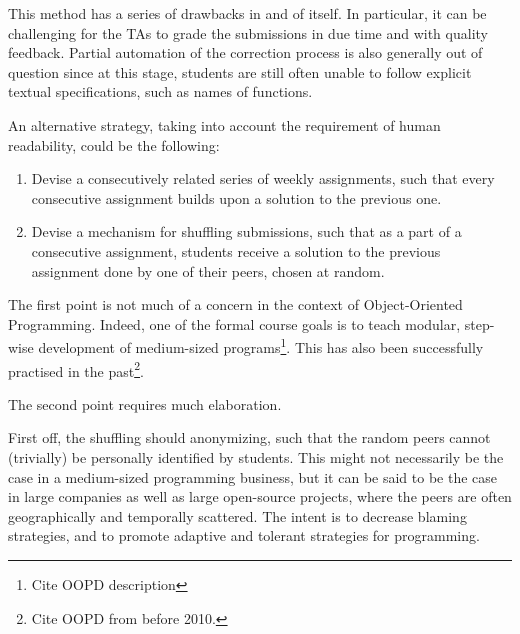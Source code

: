This method has a series of drawbacks in and of itself. In particular, it can
be challenging for the TAs to grade the submissions in due time and with
quality feedback. Partial automation of the correction process is also
generally out of question since at this stage, students are still often unable
to follow explicit textual specifications, such as names of functions.

An alternative strategy, taking into account the requirement of human
readability, could be the following:

\begin{enumerate}

\item Devise a consecutively related series of weekly assignments, such
that every consecutive assignment builds upon a solution to the previous one.

\item Devise a mechanism for shuffling submissions, such that as a part of a
consecutive assignment, students receive a solution to the previous assignment
done by one of their peers, chosen at random.

\end{enumerate}

The first point is not much of a concern in the context of Object-Oriented
Programming.  Indeed, one of the formal course goals is to teach modular,
step-wise development of medium-sized programs\footnote{Cite OOPD description}.
This has also been successfully practised in the past\footnote{Cite OOPD from
before 2010.}.

The second point requires much elaboration.

First off, the shuffling should anonymizing, such that the random peers cannot
(trivially) be personally identified by students. This might not necessarily be
the case in a medium-sized programming business, but it can be said to be the
case in large companies as well as large open-source projects, where the peers
are often geographically and temporally scattered. The intent is to decrease
blaming strategies, and to promote adaptive and tolerant strategies for
programming.

